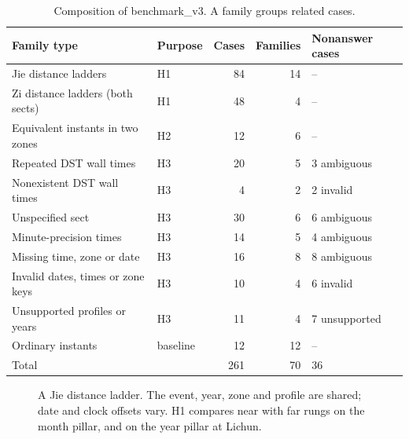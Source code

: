 \documentclass[12pt,letterpaper]{article}
\begin{document}
\begin{table}[htbp]
\centering
\caption{Composition of benchmark\_v3. A family groups related cases.}
\label{tab:data}
\begin{tabular}{llrrl}
\toprule
Family type & Purpose & Cases & Families & Nonanswer cases\\
\midrule
Jie distance ladders & H1 & 84 & 14 & --\\
Zi distance ladders (both sects) & H1 & 48 & 4 & --\\
Equivalent instants in two zones & H2 & 12 & 6 & --\\
Repeated DST wall times & H3 & 20 & 5 & 3 ambiguous\\
Nonexistent DST wall times & H3 & 4 & 2 & 2 invalid\\
Unspecified sect & H3 & 30 & 6 & 6 ambiguous\\
Minute-precision times & H3 & 14 & 5 & 4 ambiguous\\
Missing time, zone or date & H3 & 16 & 8 & 8 ambiguous\\
Invalid dates, times or zone keys & H3 & 10 & 4 & 6 invalid\\
Unsupported profiles or years & H3 & 11 & 4 & 7 unsupported\\
Ordinary instants & baseline & 12 & 12 & --\\
\midrule
Total & & 261 & 70 & 36\\
\bottomrule
\end{tabular}
\end{table}

\begin{figure}[htbp]
\centering
{}
\caption{A Jie distance ladder. The event, year, zone and profile are shared; date and clock offsets vary. H1 compares near with far rungs on the month pillar, and on the year pillar at Lichun.}
\label{fig:ladder}
\end{figure}
\end{document}
